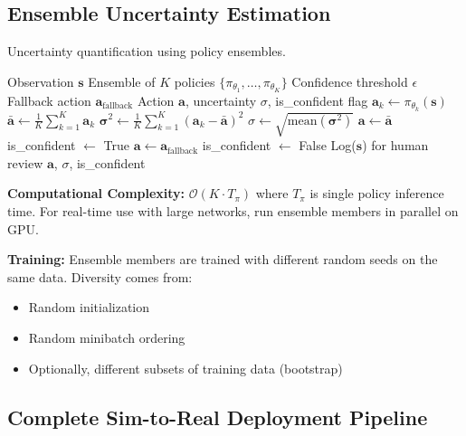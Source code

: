 \subsection{Ensemble Uncertainty Estimation}

Uncertainty quantification using policy ensembles.

\begin{algorithm}[H]
\caption{Ensemble Policy with Uncertainty}
\label{alg:ensemble_uncertainty}
\begin{algorithmic}[1]
\REQUIRE Observation $\mathbf{s}$
\REQUIRE Ensemble of $K$ policies $\{\pi_{\theta_1}, \ldots, \pi_{\theta_K}\}$
\REQUIRE Confidence threshold $\epsilon$
\REQUIRE Fallback action $\mathbf{a}_{\text{fallback}}$
\ENSURE Action $\mathbf{a}$, uncertainty $\sigma$, is\_confident flag
\STATE {}
    \STATE $\mathbf{a}_k \gets \pi_{\theta_k}(\mathbf{s})$
\ENDFOR
\STATE
\STATE {}
\STATE $\bar{\mathbf{a}} \gets \frac{1}{K} \sum_{k=1}^{K} \mathbf{a}_k$
\STATE $\boldsymbol{\sigma}^2 \gets \frac{1}{K} \sum_{k=1}^{K} (\mathbf{a}_k - \bar{\mathbf{a}})^2$
\STATE $\sigma \gets \sqrt{\text{mean}(\boldsymbol{\sigma}^2)}$ 
\STATE
\STATE {}
\IF{$\sigma < \epsilon$}
    \STATE $\mathbf{a} \gets \bar{\mathbf{a}}$
    \STATE is\_confident $\gets$ True
\ELSE
    \STATE $\mathbf{a} \gets \mathbf{a}_{\text{fallback}}$
    \STATE is\_confident $\gets$ False
    \STATE Log($\mathbf{s}$) for human review 
\ENDIF
\RETURN $\mathbf{a}$, $\sigma$, is\_confident
\end{algorithmic}
\end{algorithm}

\textbf{Computational Complexity:} $\mathcal{O}(K \cdot T_\pi)$ where $T_\pi$ is single policy inference time. For real-time use with large networks, run ensemble members in parallel on GPU.

\textbf{Training:} Ensemble members are trained with different random seeds on the same data. Diversity comes from:
\begin{itemize}
    \item Random initialization
    \item Random minibatch ordering
    \item Optionally, different subsets of training data (bootstrap)
\end{itemize}

\subsection{Complete Sim-to-Real Deployment Pipeline}


